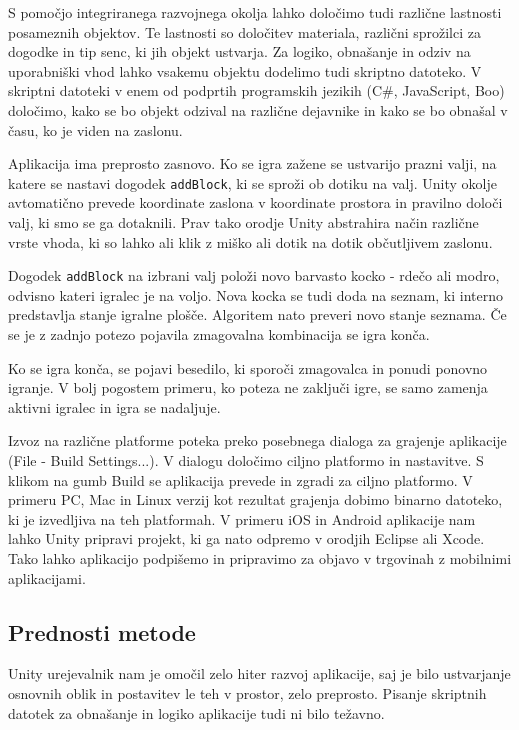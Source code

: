 S pomočjo integriranega razvojnega okolja lahko določimo tudi različne lastnosti posameznih objektov. Te lastnosti so določitev materiala, različni sprožilci za dogodke in tip senc, ki jih objekt ustvarja. Za logiko, obnašanje in odziv na uporabniški vhod lahko vsakemu objektu dodelimo tudi skriptno datoteko. V skriptni datoteki v enem od podprtih programskih jezikih (C\#, JavaScript, Boo) določimo, kako se bo objekt odzival na različne dejavnike in kako se bo obnašal v času, ko je viden na zaslonu.

Aplikacija ima preprosto zasnovo. Ko se igra zažene se ustvarijo prazni valji, na katere se nastavi dogodek \texttt{addBlock}, ki se sproži ob dotiku na valj. Unity okolje avtomatično prevede koordinate zaslona v koordinate prostora in pravilno določi valj, ki smo se ga dotaknili. Prav tako orodje Unity abstrahira način različne vrste vhoda, ki so lahko ali klik z miško ali dotik na dotik občutljivem zaslonu.

Dogodek \texttt{addBlock} na izbrani valj položi novo barvasto kocko - rdečo ali modro, odvisno kateri igralec je na voljo. Nova kocka se tudi doda na seznam, ki interno predstavlja stanje igralne plošče. Algoritem nato preveri novo stanje seznama. Če se je z zadnjo potezo pojavila zmagovalna kombinacija se igra konča.

Ko se igra konča, se pojavi besedilo, ki sporoči zmagovalca in ponudi ponovno igranje. V bolj pogostem primeru, ko poteza ne zaključi igre, se samo zamenja aktivni igralec in igra se nadaljuje. 

Izvoz na različne platforme poteka preko posebnega dialoga za grajenje aplikacije (File - Build Settings...). V dialogu določimo ciljno platformo in nastavitve. S klikom na gumb Build se aplikacija prevede in zgradi za ciljno platformo. V primeru PC, Mac in Linux verzij kot rezultat grajenja dobimo binarno datoteko, ki je izvedljiva na teh platformah. V primeru iOS in Android aplikacije nam lahko Unity pripravi projekt, ki ga nato odpremo v orodjih Eclipse ali Xcode. Tako lahko aplikacijo podpišemo in pripravimo za objavo v trgovinah z mobilnimi aplikacijami.

\subsection{Prednosti metode}

Unity urejevalnik nam je omočil zelo hiter razvoj aplikacije, saj je bilo ustvarjanje osnovnih oblik in postavitev le teh v prostor, zelo preprosto. Pisanje skriptnih datotek za obnašanje in logiko aplikacije tudi ni bilo težavno.

